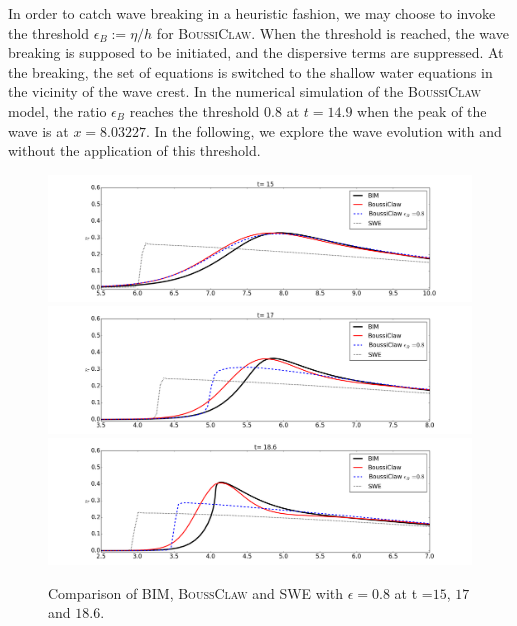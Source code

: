\documentclass[review]{elsarticle}
\begin{document}
In order to catch wave breaking in a heuristic fashion,
we may choose to invoke the threshold $\epsilon_B:=\eta/h$ for \textsc{BoussiClaw}.
When the threshold is reached, the wave breaking is supposed to be initiated, 
and the dispersive terms are suppressed. At the breaking, the set of equations is
switched to the shallow water equations in the vicinity of the wave crest.
In the numerical simulation of the \textsc{BoussiClaw} model,
the ratio $\epsilon_B$ reaches the threshold $0.8$ at $t=14.9$
when the peak of the wave is at $x=8.03227$.
In the following, we explore the wave evolution with and without
the application of this threshold.

\begin{figure}[!htb]
\centering
\includegraphics[width=.9\textwidth]{_fig/bim_dgeo_etaB8_150.png}\\
\includegraphics[width=.9\textwidth]{_fig/bim_dgeo_etaB8_170.png}\\
\includegraphics[width=.9\textwidth]{_fig/bim_dgeo_etaB8_186.png}
\caption{Comparison of BIM, \textsc{BoussClaw} and SWE 
with $\epsilon=0.8$ at t =$15$, $17$ and $18.6$.}
\label{fig:dgeo_th08}
\end{figure}
\end{document}
